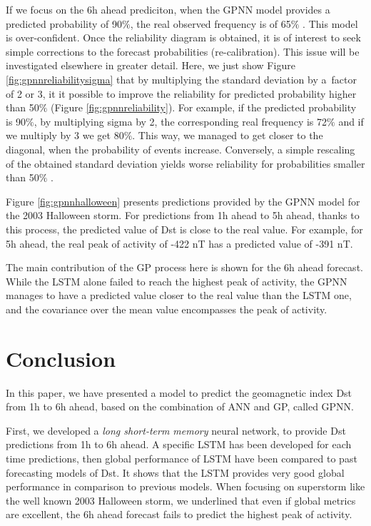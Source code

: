If we focus on the 6h ahead prediciton, when the GPNN model provides a predicted probability of 90$\%$, the 
real observed frequency is of 65$\%$ . This model is over-confident. Once the reliability diagram is obtained, 
it is of interest to seek simple corrections to the forecast probabilities (re-calibration). This issue will be 
investigated elsewhere in greater detail. Here, we just show Figure \ref{fig:gpnnreliabilitysigma} that by multiplying 
the standard deviation by a\ factor of 2 or 3, it it possible to improve the reliability for predicted probability 
higher than 50$\%$ (Figure \ref{fig:gpnnreliability}). For example, if the predicted probability is 90$\%$, 
by multiplying sigma by 2, the corresponding real frequency is 72$\%$ and if we multiply by 3 we get 80$\%$. 
This way, we managed to get closer to the diagonal, when the probability of events increase. Conversely, 
a simple rescaling of the obtained standard deviation yields worse reliability for probabilities smaller than 50$\%$ .  


Figure \ref{fig:gpnnhalloween} presents predictions provided by the GPNN model for the 2003 Halloween storm. 
For predictions from 1h ahead to 5h ahead, thanks to this process, the predicted value of Dst is close to the 
real value. For example, for 5h ahead, the real peak of activity of -422 nT has a predicted value of -391 nT. 

The main contribution of the GP process here is shown for the 6h ahead forecast. While the LSTM alone failed to 
reach the highest peak of activity, the GPNN manages to have a predicted value closer to the real value than 
the LSTM one, and the covariance over the mean value encompasses the peak of activity.



\section{Conclusion}


In this paper, we have presented a model to predict the geomagnetic index Dst from 1h to 6h ahead, 
based on the combination of ANN and GP, called GPNN. 

First, we developed a \emph{long short-term memory} neural network, to provide Dst predictions from 1h to 6h ahead. 
A specific LSTM has been developed for each time predictions, then global performance of LSTM have been compared 
to past forecasting models of Dst. It shows that the LSTM provides very good global performance in comparison 
to previous models. When focusing on superstorm like the well known 2003 Halloween storm, we underlined that 
even if global metrics are excellent, the 6h ahead forecast fails to predict the highest peak of activity. 


